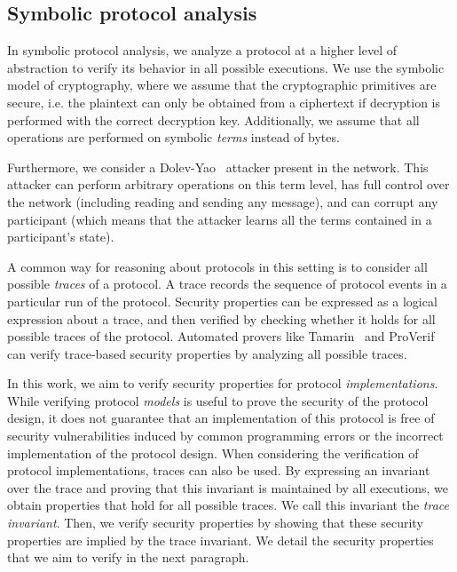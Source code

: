\subsection{Symbolic protocol analysis}
\label{sec:symbolic-protocol-analysis}

In symbolic protocol analysis, we analyze a protocol at a higher level of abstraction to verify its behavior in all possible executions.
We use the symbolic model of cryptography, where we assume that the cryptographic primitives are secure, i.e. the plaintext can only be obtained from a ciphertext if decryption is performed with the correct decryption key.
Additionally, we assume that all operations are performed on symbolic \emph{terms} instead of bytes.%

Furthermore, we consider a Dolev-Yao~\cite{dolev1983security} attacker present in the network. This attacker can perform arbitrary operations on this term level, has full control over the network (including reading and sending any message), and can corrupt any participant (which means that the attacker learns all the terms contained in a participant's state).

A common way for reasoning about protocols in this setting is to consider all possible \emph{traces} of a protocol.
A trace records the sequence of protocol events in a particular run of the protocol.
Security properties can be expressed as a logical expression about a trace, and then verified by checking whether it holds for all possible traces of the protocol.
Automated provers like Tamarin~\cite{meier2013tamarin} and ProVerif~\cite{blanchet2016modeling} can verify trace-based security properties by analyzing all possible traces.

In this work, we aim to verify security properties for protocol \emph{implementations}.
While verifying protocol \emph{models} is useful to prove the security of the protocol design, it does not guarantee that an implementation of this protocol is free of security vulnerabilities induced by common programming errors or the incorrect implementation of the protocol design.
When considering the verification of protocol implementations, traces can also be used.
By expressing an invariant over the trace and proving that this invariant is maintained by all executions, we obtain properties that hold for all possible traces. 
We call this invariant the \emph{trace invariant}.
Then, we verify security properties by showing that these security properties are implied by the trace invariant.
We detail the security properties that we aim to verify in the next paragraph.

